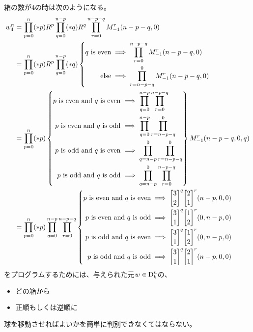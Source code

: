 	箱の数が$4$の時は次のようになる。
	\begin{equation*}\begin{split} %
		w_4^n &= \prod_{p=0}^n(*p)R^p\prod_{q=0}^{n-p}(*q)R^q\prod_{r=0}^{n-p-q}
			M_{-1}^r(n-p-q,0) \\
		&= \prod_{p=0}^n(*p)R^p\prod_{q=0}^{n-p}(*q)\left\{\begin{split}
			q\text{ is even} &\implies \prod_{r=0}^{n-p-q} M_{-1}^r(n-p-q,0) \\
			\text{else} &\implies \prod_{r=n-p-q}^{0} M_{-1}^r(n-p-q,0) \\
		\end{split}\right. \\ %
		&= \prod_{p=0}^n(*p) \left\{\begin{split}
			p\text{ is even and }q\text{ is even} &\implies 
				\prod_{q=0}^{n-p}\prod_{r=0}^{n-p-q} \\
			p\text{ is even and }q\text{ is odd} &\implies 
				\prod_{q=0}^{n-p}\prod_{r=n-p-q}^{0} \\
			p\text{ is odd and }q\text{ is even} &\implies 
				\prod_{q=n-p}^{0}\prod_{r=n-p-q}^{0} \\
			p\text{ is odd and }q\text{ is odd} &\implies
				\prod_{q=n-p}^{0}\prod_{r=0}^{n-p-q} \\
		\end{split}\right\} M_{-1}^r(n-p-q,0,q) \\
		&= \prod_{p=0}^n(*p)\prod_{q=0}^{n-p}\prod_{r=0}^{n-p-q} \left\{\begin{split}
			p\text{ is even and }q\text{ is even} &\implies 
				\move{3}{2}^q\move{2}{1}^r(n-p,0,0) \\
			p\text{ is even and }q\text{ is odd} &\implies 
				\move{3}{1}^q\move{1}{2}^r(0,n-p,0) \\
			p\text{ is odd and }q\text{ is even} &\implies 
				\move{3}{1}^q\move{1}{2}^r(0,n-p,0) \\
			p\text{ is odd and }q\text{ is odd} &\implies 
				\move{3}{1}^q\move{2}{1}^r(n-p,0,0) \\
		\end{split}\right. \\ %
	\end{split}\end{equation*} %
	をプログラムするためには、与えられた元$w\in\operatorname{D}_k^n$の、
	\begin{itemize}\setlength{\itemsep}{-1mm} %
		\item どの箱から
		\item 正順もしくは逆順に
	\end{itemize} %
	球を移動させればよいかを簡単に判別できなくてはならない。

